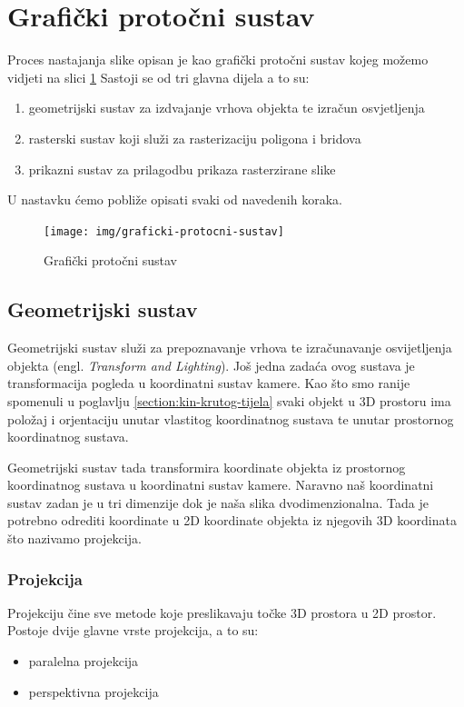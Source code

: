 \documentclass[times, utf8, diplomskirad]{fer}
\begin{document}
\section{Grafički protočni sustav}
Proces nastajanja slike opisan je kao grafički protočni sustav kojeg možemo vidjeti na slici \ref{fig:graficki-sustav}
Sastoji se od tri glavna dijela a to su:
\begin{enumerate}
    \item geometrijski sustav za izdvajanje vrhova objekta te izračun osvjetljenja
    \item rasterski sustav koji služi za rasterizaciju poligona i bridova
    \item prikazni sustav za prilagodbu prikaza rasterzirane slike
\end{enumerate}
U nastavku ćemo pobliže opisati svaki od navedenih koraka.
\begin{figure}[H]
    \centering
    \texttt{[image: img/graficki-protocni-sustav]}
    \caption{Grafički protočni sustav}
    \label{fig:graficki-sustav}
\end{figure}

\subsection{Geometrijski sustav}
Geometrijski sustav služi za prepoznavanje vrhova te izračunavanje osvijetljenja objekta (engl. \textit{Transform and Lighting}).
Još jedna zadaća ovog sustava je transformacija pogleda u koordinatni sustav kamere.
Kao što smo ranije spomenuli u poglavlju \ref{section:kin-krutog-tijela} svaki objekt u 3D prostoru ima položaj i orjentaciju unutar vlastitog koordinatnog sustava te unutar prostornog koordinatnog sustava.

Geometrijski sustav tada transformira koordinate objekta iz prostornog koordinatnog sustava u koordinatni sustav kamere.
Naravno naš koordinatni sustav zadan je u tri dimenzije dok je naša slika dvodimenzionalna.
Tada je potrebno odrediti koordinate u 2D koordinate objekta iz njegovih 3D koordinata što nazivamo projekcija.

\newpage
\subsubsection{Projekcija}
Projekciju čine sve metode koje preslikavaju točke 3D prostora u 2D prostor.
Postoje dvije glavne vrste projekcija, a to su:
\begin{itemize}
    \item paralelna projekcija
    \item perspektivna projekcija
\end{itemize}
\end{document}
